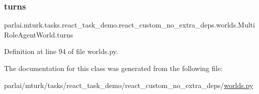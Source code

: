 \subsubsection{\texorpdfstring{turns}{turns}}
{\footnotesize\ttfamily parlai.\+mturk.\+tasks.\+react\+\_\+task\+\_\+demo.\+react\+\_\+custom\+\_\+no\+\_\+extra\+\_\+deps.\+worlds.\+Multi\+Role\+Agent\+World.\+turns}



Definition at line 94 of file worlds.\+py.



The documentation for this class was generated from the following file\+:\begin{DoxyCompactItemize}
\item 
parlai/mturk/tasks/react\+\_\+task\+\_\+demo/react\+\_\+custom\+\_\+no\+\_\+extra\+\_\+deps/\hyperlink{parlai_2mturk_2tasks_2react__task__demo_2react__custom__no__extra__deps_2worlds_8py}{worlds.\+py}\end{DoxyCompactItemize}
